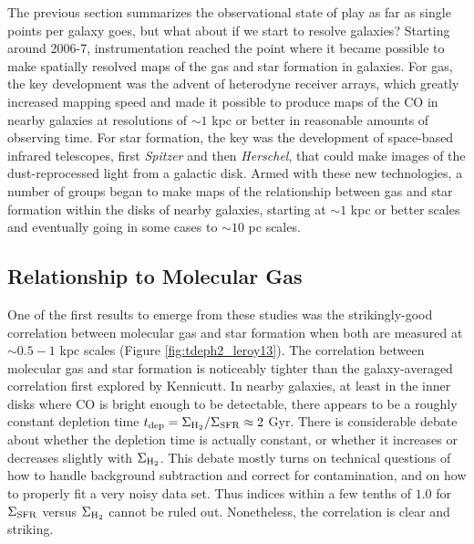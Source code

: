 The previous section summarizes the observational state of play as far as single points per galaxy goes, but what about if we start to resolve galaxies? Starting around 2006-7, instrumentation reached the point where it became possible to make spatially resolved maps of the gas and star formation in galaxies. For gas, the key development was the advent of heterodyne receiver arrays, which greatly increased mapping speed and made it possible to produce maps of the CO in nearby galaxies at resolutions of $\sim 1$ kpc or better in reasonable amounts of observing time. For star formation, the key was the development of space-based infrared telescopes, first \textit{Spitzer} and then \textit{Herschel}, that could make images of the dust-reprocessed light from a galactic disk. Armed with these new technologies, a number of groups began to make maps of the relationship between gas and star formation within the disks of nearby galaxies, starting at $\sim 1$ kpc or better scales and eventually going in some cases to $\sim 10$ pc scales.

\subsection{Relationship to Molecular Gas}

One of the first results to emerge from these studies was the strikingly-good correlation between molecular gas and star formation when both are measured at $\sim 0.5-1$ kpc scales (Figure \ref{fig:tdeph2_leroy13}). The correlation between molecular gas and star formation is noticeably tighter than the galaxy-averaged correlation first explored by Kennicutt. In nearby galaxies, at least in the inner disks where CO is bright enough to be detectable, there appears to be a roughly constant depletion time $t_{\rm dep} = \Sigma_{\rm H_2}/\Sigma_{\rm SFR} \approx 2$ Gyr. There is considerable debate about whether the depletion time is actually constant, or whether it increases or decreases slightly with $\Sigma_{\rm H_2}$. This debate mostly turns on technical questions of how to handle background subtraction and correct for contamination, and on how to properly fit a very noisy data set. Thus indices within a few tenths of $1.0$ for $\Sigma_{\rm SFR}$ versus $\Sigma_{\rm H_2}$ cannot be ruled out. Nonetheless, the correlation is clear and striking.

